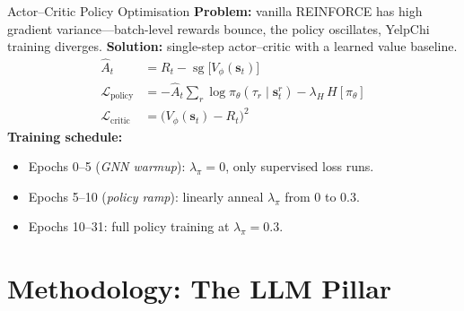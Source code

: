 \documentclass[aspectratio=169,10pt]{beamer}
\begin{document}
\begin{frame}{Actor--Critic Policy Optimisation}
    \textbf{Problem:} vanilla REINFORCE has high gradient variance---batch-level
    rewards bounce, the policy oscillates, YelpChi training diverges.
    \vspace{0.5em}
    \textbf{Solution:} single-step actor--critic with a learned value baseline.
    \begin{align*}
        \hat{A}_t &= R_t - \operatorname{sg}\!\bigl[V_\phi(\mathbf{s}_t)\bigr]\\
        \mathcal{L}_{\text{policy}} &= -\hat{A}_t \sum_r \log \pi_\theta(\tau_r\mid\mathbf{s}_t^r)
            - \lambda_H\, H[\pi_\theta]\\
        \mathcal{L}_{\text{critic}} &= \bigl(V_\phi(\mathbf{s}_t) - R_t\bigr)^2
    \end{align*}
    \vspace{0.3em}
    \textbf{Training schedule:}
    \begin{itemize}\footnotesize
        \item Epochs 0--5 (\emph{GNN warmup}): $\lambda_\pi = 0$, only supervised loss runs.
        \item Epochs 5--10 (\emph{policy ramp}): linearly anneal $\lambda_\pi$ from 0 to 0.3.
        \item Epochs 10--31: full policy training at $\lambda_\pi = 0.3$.
    \end{itemize}
\end{frame}

\section{Methodology: The LLM Pillar}
\end{document}
